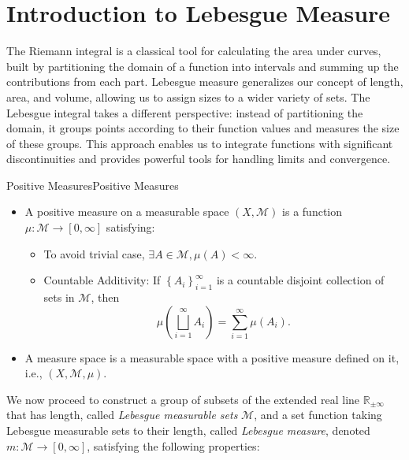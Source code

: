 \documentclass[../main.tex]{subfiles}
\begin{document}
\section{Introduction to Lebesgue Measure}
The Riemann integral is a classical tool for calculating the area under curves, built by partitioning the domain of a function into intervals and summing up the contributions from each part. Lebesgue measure generalizes our concept of length, area, and volume, allowing us to assign sizes to a wider variety of sets. The Lebesgue integral takes a different perspective: instead of partitioning the domain, it groups points according to their function values and measures the size of these groups. This approach enables us to integrate functions with significant discontinuities and provides powerful tools for handling limits and convergence.

\begin{definition}{Positive Measures}{Positive Measures}
	\begin{itemize}
	\item A positive measure on a measurable space $(X, \mathcal{M})$ is a function $\mu: \mathcal{M} \rightarrow [0,\infty ]$ satisfying:
		\begin{itemize}
		\item To avoid trivial case, $\exists A\in \mathcal{M}, \mu(A) < \infty $.
		\item Countable Additivity: If $\left\{ A_i \right\}_{i=1}^{\infty }$ is a countable disjoint collection of sets in $\mathcal{M}$, then
			\begin{equation}
			\mu\left(\bigsqcup_{i=1}^{\infty } A_i\right) = \sum_{i=1}^{\infty } \mu(A_i).
			\end{equation}
		\end{itemize}
	\item A measure space is a measurable space with a positive measure defined on it, i.e., $(X, \mathcal{M}, \mu)$.
	\end{itemize}
\end{definition}

We now proceed to construct a group of subsets of the extended real line $\mathbb{R}_{\pm \infty }$ that has length, called \emph{Lebesgue measurable sets} $\mathcal{M}$, and a set function taking Lebesgue measurable sets to their length, called \emph{Lebesgue measure}, denoted $m: \mathcal{M} \rightarrow [0, \infty ]$, satisfying the following properties:
\end{document}
